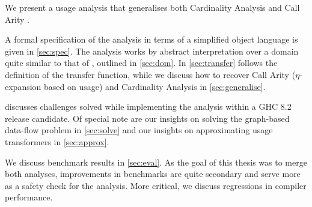 We present a usage analysis that generalises both Cardinality Analysis \parencite{card} and Call Arity \parencite{callarity}.


A formal specification of the analysis in terms of a simplified object language is given in \cref{sec:spec}.
The analysis works by abstract interpretation over a domain quite similar to that of \textcite{card}, outlined in \cref{sec:dom}.
In \cref{sec:transfer} follows the definition of the transfer function, while we discuss how to recover Call Arity (\eg $\eta$-expansion based on usage) and Cardinality Analysis in \cref{sec:generalise}.

 discusses challenges solved while implementing the analysis within a GHC 8.2 release candidate.
Of special note are our insights on solving the graph-based data-flow problem in \cref{sec:solve} and our insights on approximating usage transformers in \cref{sec:approx}.

We discuss benchmark results in \cref{sec:eval}.
As the goal of this thesis was to merge both analyses, improvements in benchmarks are quite secondary and serve more as a safety check for the analysis.
More critical, we discuss regressions in compiler performance.

